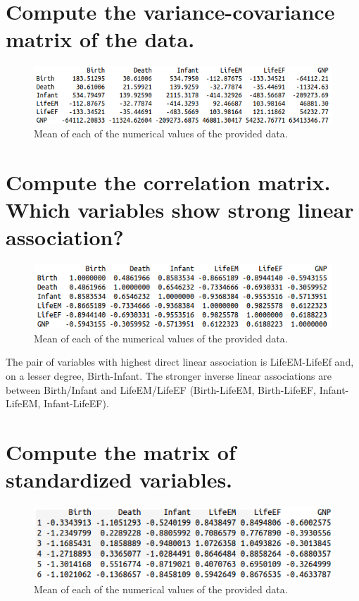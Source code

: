 \documentclass[10pt, a4paper, oneside]{article}
\begin{document}
\section{Compute the variance-covariance matrix of the data.}

\vspace{5mm}
\begin{figure}[h!]\centering\includegraphics[scale=0.6]{pov_cov.png}\caption{Mean of each of the numerical values of the provided data.}\label{mean}\end{figure}
\vspace{5mm}

\pagebreak

\section{Compute the correlation matrix. Which variables show strong linear association?}

\vspace{5mm}
\begin{figure}[h!]\centering\includegraphics[scale=0.6]{pov_cor.png}\caption{Mean of each of the numerical values of the provided data.}\label{pov_cor}\end{figure}
\vspace{5mm}

The pair of variables with highest direct linear association is LifeEM-LifeEf and, on a lesser degree, Birth-Infant. The stronger inverse linear associations are between Birth/Infant and LifeEM/LifeEF (Birth-LifeEM, Birth-LifeEF, Infant-LifeEM, Infant-LifeEF).

\section{Compute the matrix of standardized variables.}

\vspace{5mm}
\begin{figure}[h!]\centering\includegraphics[scale=0.6]{poverty_standardized.png}\caption{Mean of each of the numerical values of the provided data.}\label{mean}\end{figure}
\vspace{5mm}
\end{document}
